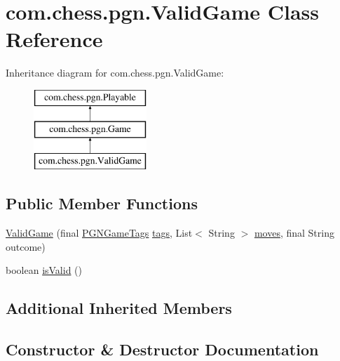 \hypertarget{classcom_1_1chess_1_1pgn_1_1_valid_game}{}\section{com.\+chess.\+pgn.\+Valid\+Game Class Reference}
\label{classcom_1_1chess_1_1pgn_1_1_valid_game}
Inheritance diagram for com.\+chess.\+pgn.\+Valid\+Game\+:\begin{figure}[H]
\begin{center}
\leavevmode
\includegraphics[height=3.000000cm]{classcom_1_1chess_1_1pgn_1_1_valid_game}
\end{center}
\end{figure}
\subsection*{Public Member Functions}
\begin{DoxyCompactItemize}
\item 
\mbox{\hyperlink{classcom_1_1chess_1_1pgn_1_1_valid_game_a06bdb06a68915af5f7d40fa00774f409}{Valid\+Game}} (final \mbox{\hyperlink{classcom_1_1chess_1_1pgn_1_1_p_g_n_game_tags}{P\+G\+N\+Game\+Tags}} \mbox{\hyperlink{classcom_1_1chess_1_1pgn_1_1_game_aadfd202e33d988f6c6520ffea05908c6}{tags}}, List$<$ String $>$ \mbox{\hyperlink{classcom_1_1chess_1_1pgn_1_1_game_a0aacc9d7cc963a7f7c6bb019f2799a2a}{moves}}, final String outcome)
\item 
boolean \mbox{\hyperlink{classcom_1_1chess_1_1pgn_1_1_valid_game_a4ec1fb23ee3461e3a089b298e75999d9}{is\+Valid}} ()
\end{DoxyCompactItemize}
\subsection*{Additional Inherited Members}


\subsection{Constructor \& Destructor Documentation}
\mbox{\label{classcom_1_1chess_1_1pgn_1_1_valid_game_a06bdb06a68915af5f7d40fa00774f409}} 
